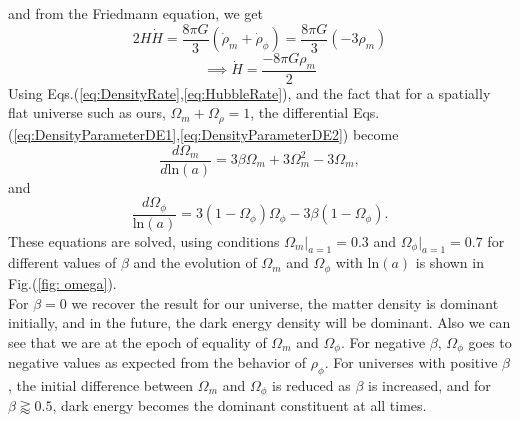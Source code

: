 \documentclass[preprint,aps,floatfix]{revtex4}
\def\nn{\nonumber}
\begin{document}
        and from the Friedmann equation, we get
        \begin{equation}\label{eq:HubbleRate}
            2H\dot{H} = \frac{8\pi G}{3}(\dot\rho_m + \dot\rho_\phi) = \frac{8\pi G}{3}(-3\rho_m)\nn
        \end{equation}
        \begin{equation}
            \implies \dot{H}= \frac{-8\pi G \rho_m}{2}
        \end{equation}
        Using Eqs.(\ref{eq:DensityRate},\ref{eq:HubbleRate}), and the fact that for a spatially flat universe such as ours, $\Omega_m + \Omega_\rho = 1$, the differential Eqs.(\ref{eq:DensityParameterDE1},\ref{eq:DensityParameterDE2}) become
        \begin{equation}
            \frac{d\Omega_m}{d\text{ln}(a)} = 3\beta \Omega_m + 3 \Omega_m^2 -3\Omega_m,
        \end{equation}
        and 
        \begin{equation}
            \frac{d\Omega_\phi}{\text{ln}(a)} =3 (1-\Omega_\phi)\Omega_\phi -3\beta (1-\Omega_\phi).
        \end{equation}
        These equations are solved, using conditions $\Omega_m |_{a = 1} = 0.3$ and $\Omega_\phi |_{a = 1} = 0.7$ for different values of $\beta$ and the evolution of $\Omega_m$ and $\Omega_\phi$ with ln$(a)$ is shown in Fig.(\ref{fig: omega}).\\

        For $\beta=0$ we recover the result for our universe, the matter density is dominant initially, and in the future, the dark energy density will be dominant. Also we can see that we are at the epoch of equality of $\Omega_m$ and $\Omega_\phi$. For negative $\beta$, $\Omega_\phi$ goes to negative values as expected from the behavior of $\rho_\phi$. For universes with positive $\beta$, the initial difference between $\Omega_m$ and $\Omega_\phi$ is reduced as $\beta$ is increased, and for $\beta \gtrapprox 0.5$, dark energy becomes the dominant constituent at all times.
        
\end{document}
